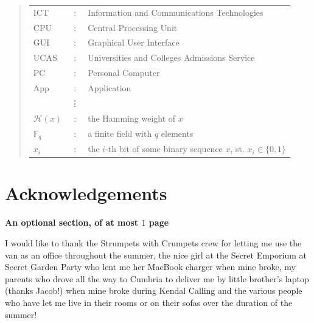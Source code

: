 \documentclass[ %
                    author={Jonathan Rankin},
                supervisor={Dr. David May, Dr. Ian Holyer},
                    degree={MEng},
                     title={CodeTouch},
                  subtitle={A Revolutionary Way To Program Real Code On Touch Screen Devices},
                      type={enterprise},
                      year={2015 } ]{dissertation}
\begin{document}
\begin{quote}
\noindent
\begin{tabular}{lcl}
ICT               &:     & Information and Communications Technologies                                        \\
CPU                &:     & Central Processing Unit                                            \\
GUI            &:     & Graphical User Interface                                      \\
UCAS           &:     & Universities and Colleges Admissions Service \\
PC       &:     & Personal Computer \\
App      &:     & Application \\
                    &\vdots&                                                                      \\
${\mathcal H}( x )$ &:     & the Hamming weight of $x$                                            \\
${\mathbb  F}_q$    &:     & a finite field with $q$ elements                                     \\
$x_i$               &:     & the $i$-th bit of some binary sequence $x$, st. $x_i \in \{ 0, 1 \}$ \\
\end{tabular}
\end{quote}


\chapter*{Acknowledgements}

{\bf An optional section, of at most $1$ page}
\vspace{1cm} 

\noindent
I would like to thank the Strumpets with Crumpets crew for letting me use the van as an office throughout the summer, the nice girl at the Secret Emporium at Secret Garden Party who lent me her MacBook charger when mine broke, my parents who drove all the way to Cumbria to deliver me by little brother's laptop (thanks Jacob!) when mine broke during Kendal Calling and the various people who have let me live in their rooms or on their sofas over the duration of the summer!

\end{document}

